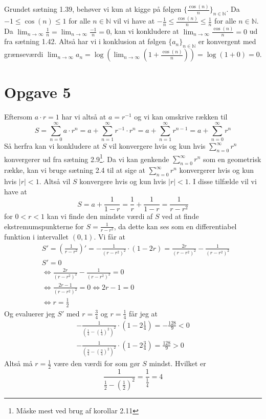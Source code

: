\documentclass{article}
\newcommand{\m}[1]{\mathbb{#1}}
\newcommand{\mN}{\m{N}}
\newcommand{\lr}[1]{\left( #1\right)}
\begin{document}
Grundet sætning 1.39, behøver vi kun at kigge på følgen $\{ \frac{\cos(n)}{n}\}_{n \in \mN}$.
Da $-1 \le \cos(n) \le 1$ for alle $n \in \mN$ vil vi have at $- \frac{1}{n} \le \frac{\cos(n)}{n} \le \frac{1}{n}$ for alle $n \in \mN$.
Da $\lim_{n \to \infty} \frac{1}{n} = \lim_{n \to \infty} \frac{-1}{n} = 0$, kan vi konkludere at
$\lim_{n \to \infty} \frac{\cos(n)}{n} = 0$ ud fra sætning 1.42.
Altså har vi i konklusion at følgen $\{ a_n \}_{n \in \mN}$ er konvergent med grænseværdi $\lim_{n \to \infty} a_n =  \log( \lim_{n \to \infty} (1 + \frac{\cos(n)}{n})) = \log(1 + 0) = 0$.

\section*{Opgave 5}
Eftersom $a \cdot r = 1$ har vi altså at $a = r^{-1}$ og vi kan omskrive rækken til 
\[
    S = \sum_{n=0}^{\infty} a \cdot r^n 
    = a + \sum_{n=1}^{\infty} r^{-1} \cdot r^n 
    = a + \sum_{n=1}^{\infty} r^{n-1}
    = a + \sum_{n=0}^{\infty} r^n
\]
Så herfra kan vi konkludere at $S$ vil konvergere hvis og kun hvis $\sum_{n=0}^{\infty} r^n$ konvergerer ud fra sætning 2.9\footnote{Måske mest ved brug af korollar 2.11}.
Da vi kan genkende $\sum_{n=0}^{\infty} r^n$ som en geometrisk række, kan vi bruge sætning 2.4 til at sige at $\sum_{n=0}^{\infty} r^n$ konvergerer hvis og kun hvis $|r| < 1$. 
Altså vil $S$ konvergere hvis og kun hvis $|r| < 1$.
I disse tilfælde vil vi have at 
\[
    S = a + \frac{1}{1-r} = \frac{1}{r} + \frac{1}{1-r} 
    = \frac{1}{r-r^2}
\]
for $0 < r < 1$ kan vi finde den mindste værdi af $S$ ved at finde ekstremumspunkterne for $S = \frac{1}{r-r^2}$,
da dette kan ses som en differentiabel funktion i intervallet $(0, 1)$.
Vi får at 
\begin{align*}
    &S' = \lr{\frac{1}{r - r^2}}' = -\frac{1}{(r - r^2)^2} \cdot (1 - 2r) = \frac{2r}{(r-r^2)^2} - \frac{1}{(r-r^2)^2} \\
    &S' = 0 \\
    &\iff \frac{2r}{(r-r^2)^2} - \frac{1}{(r-r^2)^2} = 0 \\ 
    &\iff \frac{2r - 1}{(r-r^2)^2} = 0 \iff 2r - 1 = 0 \\
    &\iff r = \frac{1}{2}
\end{align*}
Og evaluerer jeg $S'$ med $r=\frac{3}{4}$ og $r = \frac{1}{4}$ får jeg at
\begin{align*}
    -\frac{1}{\lr{\frac{1}{4} - \lr{\frac{1}{4}}^2}^2} \cdot (1 - 2\frac{1}{4}) = -\frac{128}{9} < 0 \\
    -\frac{1}{\lr{\frac{3}{4} - \lr{\frac{3}{4}}^2}^2} \cdot (1 - 2\frac{3}{4}) = \frac{128}{9} > 0  
\end{align*}
Altså må $r=\frac{1}{2}$ være den værdi for som gør $S$ mindst. Hvilket er 
\[
    \frac{1}{\frac{1}{2} - \lr{\frac{1}{2}}^2} = \frac{1}{\frac{1}{4}} = 4
\]
\end{document}
